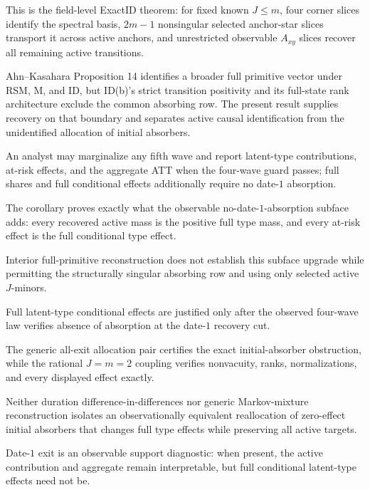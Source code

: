 This is the field-level ExactID theorem: for fixed known \(J\leq m\), four corner slices identify the spectral basis, \(2m-1\) nonsingular selected anchor-star slices transport it across active anchors, and unrestricted observable \(A_{xy}\) slices recover all remaining active transitions.

Ahn--Kasahara Proposition 14 identifies a broader full primitive vector under RSM, M, and ID, but ID(b)'s strict transition positivity and its full-state rank architecture exclude the common absorbing row.  The present result supplies recovery on that boundary and separates active causal identification from the unidentified allocation of initial absorbers.

An analyst may marginalize any fifth wave and report latent-type contributions, at-risk effects, and the aggregate ATT when the four-wave guard passes; full shares and full conditional effects additionally require no date-\(1\) absorption.

The corollary proves exactly what the observable no-date-\(1\)-absorption subface adds: every recovered active mass is the positive full type mass, and every at-risk effect is the full conditional type effect.

Interior full-primitive reconstruction does not establish this subface upgrade while permitting the structurally singular absorbing row and using only selected active \(J\)-minors.

Full latent-type conditional effects are justified only after the observed four-wave law verifies absence of absorption at the date-\(1\) recovery cut.

The generic all-exit allocation pair certifies the exact initial-absorber obstruction, while the rational \(J=m=2\) coupling verifies nonvacuity, ranks, normalizations, and every displayed effect exactly.

Neither duration difference-in-differences nor generic Markov-mixture reconstruction isolates an observationally equivalent reallocation of zero-effect initial absorbers that changes full type effects while preserving all active targets.

Date-\(1\) exit is an observable support diagnostic: when present, the active contribution and aggregate remain interpretable, but full conditional latent-type effects need not be.

